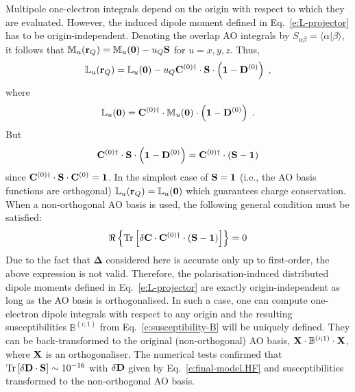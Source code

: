 \documentclass[aip,amsmath,amssymb,reprint,floatfix]{revtex4-1}
\newcommand{\braket}[2]{\ensuremath{\bigl\langle {#1} \bigl\lvert {#2} \bigr\rangle}}
\newcommand{\BM}[1]{\bm{#1}}
\DeclareMathOperator{\Tr}{Tr}
\begin{document}
Multipole one\hyp{}electron integrals depend on the origin with respect to which they are evaluated.
However, the induced dipole moment defined in Eq.~\eqref{e:L-projector} 
has to be origin\hyp{}independent. Denoting the overlap AO integrals 
by $S_{\alpha\beta} = \braket{\alpha}{\beta}$,
it follows that $\mathbb{M}_u({\bf r}_Q) = \mathbb{M}_u({\bf 0}) - u_Q {\bf S}$
for $u=x,y,z$. Thus,
%
\begin{equation}
 \mathbb{L}_u({\bf r}_Q) = \mathbb{L}_u({\bf 0})
                          - u_Q {\bf C}^{(0)\dagger} \cdot {\bf S} \cdot \left( {\bf 1} - {\bf D}^{(0)}\right) \;,
\end{equation}
%
where
%
\begin{equation}
 \mathbb{L}_u({\bf 0}) = {\bf C}^{(0)\dagger} \cdot \mathbb{M}_u({\bf 0}) \cdot \left( {\bf 1} - {\bf D}^{(0)}\right) \;.
\end{equation}
%
But
%
\begin{equation}
  {\bf C}^{(0)\dagger} \cdot {\bf S} \cdot \left( {\bf 1} - {\bf D}^{(0)}\right) 
= {\bf C}^{(0)\dagger} \cdot \left( {\bf S} - {\bf 1} \right)
\end{equation}
%
since ${\bf C}^{(0)\dagger} \cdot {\bf S} \cdot {\bf C}^{(0)} = {\bf 1}$. 
In the simplest case of ${\bf S} = {\bf 1}$ (i.e., the AO basis functions are orthogonal) 
$\mathbb{L}_u({\bf r}_Q) = \mathbb{L}_u({\bf 0})$ which guarantees charge conservation.
When a non\hyp{}orthogonal AO basis is used, 
the following general condition must be satisfied:
%
\begin{equation}
 \Re \left\{
  \Tr{
  \left[
  \delta {\bf C} \cdot {\bf C}^{(0)\dagger} \cdot \left( {\bf S} - {\bf 1} \right)  
 \right]}
 \right\} = 0
\end{equation}
%
Due to the fact that ${\BM \Delta}$ considered here is accurate only up to first\hyp{}order, 
the above expression is not valid. 
Therefore, the polarisation\hyp{}induced distributed dipole moments 
defined in Eq.~\eqref{e:L-projector} are exactly origin\hyp{}independent
as long as the AO basis is orthogonalised.
In such a case, one can compute one\hyp{}electron dipole integrals with respect to any origin 
and the resulting susceptibilities $\mathbb{B}^{(i;1)}$ 
from Eq.~\eqref{e:susceptibility-B} will be uniquely defined. They can be back\hyp{}transformed
to the original (non\hyp{}orthogonal) AO basis, 
${\bf X} \cdot \mathbb{B}^{(i;1)} \cdot {\bf X}$, where $\bf X$ is an orthogonaliser.
The numerical tests confirmed that $\Tr\left[\delta{\bf D}\cdot{\bf S}\right] \sim 10^{-16}$
with $\delta{\bf D}$ given by Eq.~\eqref{e:final-model.HF} and susceptibilities transformed
to the non\hyp{}orthogonal AO basis.
\end{document}
